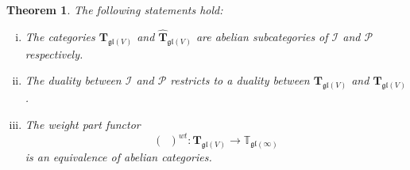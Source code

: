 \documentclass[12pt,reqno]{amsart}
\newtheorem{thm}{Theorem}[section]
\theoremstyle{definition}
\theoremstyle{remark}
\begin{document}
	
	
	\begin{thm}\label{thm:main}
	The following statements hold:
	\begin{enumerate}[(i)]
	    \item \label{uno}
	    The categories $\mathbf{T}_{\mathfrak{gl}(V)}$ and $\widehat{{\mathbf T}}_{\mathfrak{gl}(V)}$ are abelian subcategories of $\mathcal{I}$ and $\mathcal{P}$ respectively.
	    \item \label{due}
	    The duality between $\mathcal{I}$ and $\mathcal{P}$ restricts to a duality between $\mathbf{T}_{\mathfrak{gl}(V)}$ and $\widehat{{\mathbf T}}_{\mathfrak{gl}(V)}$.
	    \item \label{tre}
	    The weight part functor
	    $$
	    (\phantom{a})^{wt}: \mathbf{T}_{\mathfrak{gl}(V)} \rightarrow \mathbb{T}_{\mathfrak{gl}(\infty)}
	    $$
	    is an equivalence of abelian categories.
	\end{enumerate}
	\end{thm}
\end{document}
